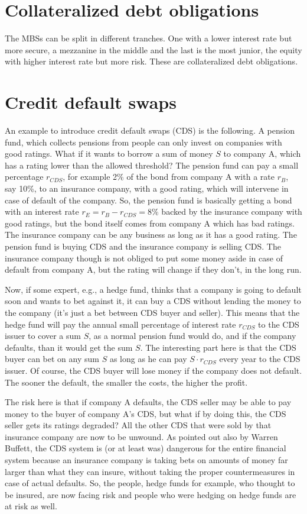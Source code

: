 \section{Collateralized debt obligations}
The MBSs can be split in different tranches. One with a lower interest rate but more secure, a mezzanine in the middle and the last is the most junior, the equity with higher interest rate but more risk. These are collateralized debt obligations.

\section{Credit default swaps}
An example to introduce credit default swaps (CDS) is the following. A pension fund, which collects pensions from people can only invest on companies with good ratings. What if it wants to borrow a sum of money $S$ to company A, which has a rating lower than the allowed threshold? The pension fund can pay a small percentage $r_{CDS}$, for example 2\% of the bond from company A with a rate $r_B$, say 10\%, to an insurance company, with a good rating, which will intervene in case of default of the company. So, the pension fund is basically getting a bond with an interest rate $r_E = r_B - r_{CDS} = 8\%$ backed by the insurance company with good ratings, but the bond itself comes from company A which has bad ratings. The insurance company can be any business as long as it has a good rating. The pension fund is buying CDS and the insurance company is selling CDS. The insurance company though is not obliged to put some money aside in case of default from company A, but the rating will change if they don't, in the long run.

Now, if some expert, e.g., a hedge fund, thinks that a company is going to default soon and wants to bet against it, it can buy a CDS without lending the money to the company (it's just a bet between CDS buyer and seller). This means that the hedge fund will pay the annual small percentage of interest rate $r_{CDS}$ to the CDS issuer to cover a sum $S$, as a normal pension fund would do, and if the company defaults, than it would get the sum $S$. The interesting part here is that the CDS buyer can bet on any sum $S$ as long as he can pay $S\cdot r_{CDS}$ every year to the CDS issuer. Of course, the CDS buyer will lose money if the company does not default. The sooner the default, the smaller the costs, the higher the profit.

The risk here is that if company A defaults, the CDS seller may be able to pay money to the buyer of company A's CDS, but what if by doing this, the CDS seller gets its ratings degraded? All the other CDS that were sold by that insurance company are now to be unwound. 
As pointed out also by Warren Buffett, the CDS system is (or at least was) dangerous for the entire financial system because an insurance company is taking bets on amounts of money far larger than what they can insure, without taking the proper countermeasures in case of actual defaults. So, the people, hedge funds for example, who thought to be insured, are now facing risk and people who were hedging on hedge funds are at risk as well.

